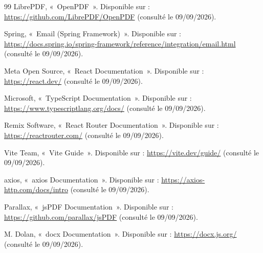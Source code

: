\begin{thebibliography}{99}
LibrePDF, «~OpenPDF~». Disponible sur : \url{https://github.com/LibrePDF/OpenPDF} (consulté le 09/09/2026).

Spring, «~Email (Spring Framework)~». Disponible sur : \url{https://docs.spring.io/spring-framework/reference/integration/email.html} (consulté le 09/09/2026).

Meta Open Source, «~React Documentation~». Disponible sur : \url{https://react.dev/} (consulté le 09/09/2026).

Microsoft, «~TypeScript Documentation~». Disponible sur : \url{https://www.typescriptlang.org/docs/} (consulté le 09/09/2026).

Remix Software, «~React Router Documentation~». Disponible sur : \url{https://reactrouter.com/} (consulté le 09/09/2026).

Vite Team, «~Vite Guide~». Disponible sur : \url{https://vite.dev/guide/} (consulté le 09/09/2026).

axios, «~axios Documentation~». Disponible sur : \url{https://axios-http.com/docs/intro} (consulté le 09/09/2026).

Parallax, «~jsPDF Documentation~». Disponible sur : \url{https://github.com/parallax/jsPDF} (consulté le 09/09/2026).

M. Dolan, «~docx Documentation~». Disponible sur : \url{https://docx.js.org/} (consulté le 09/09/2026).

\end{thebibliography}
